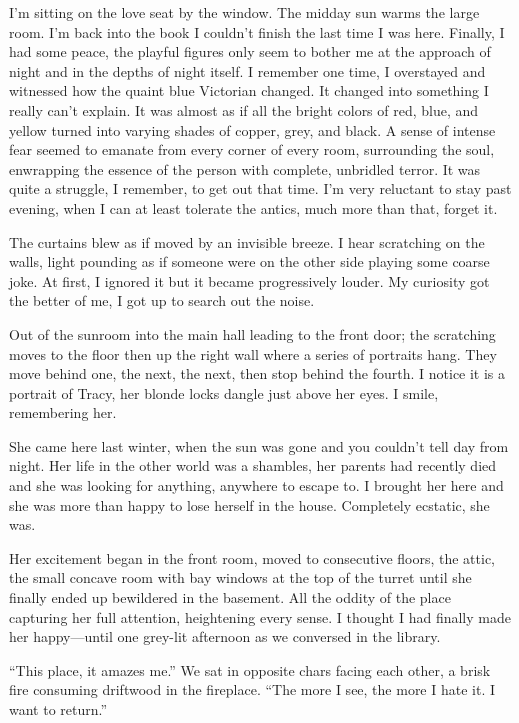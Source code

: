 \documentclass[
]{article}
\begin{document}
I'm sitting on the love seat by the window. The midday sun warms the
large room. I'm back into the book I couldn't finish the last time I was
here. Finally, I had some peace, the playful figures only seem to bother
me at the approach of night and in the depths of night itself. I
remember one time, I overstayed and witnessed how the quaint blue
Victorian changed. It changed into something I really can't explain. It
was almost as if all the bright colors of red, blue, and yellow turned
into varying shades of copper, grey, and black. A sense of intense fear
seemed to emanate from every corner of every room, surrounding the soul,
enwrapping the essence of the person with complete, unbridled terror. It
was quite a struggle, I remember, to get out that time. I'm very
reluctant to stay past evening, when I can at least tolerate the antics,
much more than that, forget it.

The curtains blew as if moved by an invisible breeze. I hear scratching
on the walls, light pounding as if someone were on the other side
playing some coarse joke. At first, I ignored it but it became
progressively louder. My curiosity got the better of me, I got up to
search out the noise.

Out of the sunroom into the main hall leading to the front door; the
scratching moves to the floor then up the right wall where a series of
portraits hang. They move behind one, the next, the next, then stop
behind the fourth. I notice it is a portrait of Tracy, her blonde locks
dangle just above her eyes. I smile, remembering her.

She came here last winter, when the sun was gone and you couldn't tell
day from night. Her life in the other world was a shambles, her parents
had recently died and she was looking for anything, anywhere to escape
to. I brought her here and she was more than happy to lose herself in
the house. Completely ecstatic, she was.

Her excitement began in the front room, moved to consecutive floors, the
attic, the small concave room with bay windows at the top of the turret
until she finally ended up bewildered in the basement. All the oddity of
the place capturing her full attention, heightening every sense. I
thought I had finally made her happy---until one grey-lit afternoon as
we conversed in the library.

``This place, it amazes me.'' We sat in opposite chars facing each
other, a brisk fire consuming driftwood in the fireplace. ``The more I
see, the more I hate it. I want to return.''
\end{document}
